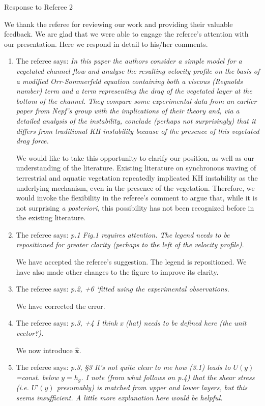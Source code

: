 \documentclass[letterpaper,10pt]{article}
\newcommand{\bx}{\mathbf{x}}
\begin{document}
\centerline{Response to Referee 2}
We thank the referee for reviewing our work and providing their valuable feedback. 
We are glad that we were able to engage the referee's attention with our presentation.
Here we respond in detail to his/her comments.
\begin{enumerate}
\item The referee says:
\textit{
In this paper the authors consider a simple model for a vegetated channel flow and analyse the resulting velocity profile on the basis of a modified Orr-Sommerfeld equation containing both a viscous (Reynolds number) term and a term representing the drag of the vegetated layer at the bottom of the channel. They compare some experimental data from an earlier paper from Nepf’s group with the implications of their theory and, via a detailed analysis of the instability, conclude (perhaps not surprisingly) that it differs from traditional KH instability because of the presence of this vegetated drag force.
}

We would like to take this opportunity to clarify our position, as well as our understanding of the literature.
Existing literature on synchronous waving of terrestrial and aquatic vegetation repeatedly implicated KH instability as the underlying mechanism, even in the presence of the vegetation. 
Therefore, we would invoke the flexibility in the referee's comment to argue that, while it is not surprising \textit{a posteriori}, this possibility has not been recognized before in the existing literature.

\item The referee says:
\textit{p.1 Fig.1 requires attention. The legend needs to be repositioned for greater
clarity (perhaps to the left of the velocity profile).}

We have accepted the referee's suggestion. The legend is repositioned. We have also made other changes to the figure to improve its clarity.

\item The referee says:
\textit{
p.2, +6 ‘fitted using the experimental observations.
}

We have corrected the error.

\item The referee says:
\textit{
p.3, +4 I think x (hat) needs to be defined here (the unit vector?).
}

We now introduce $\hat{\bx}$.

\item The referee says:
\textit{
p.3, \S 3 It’s not quite clear to me how (3.1) leads to $U(y)$=const. below $y=h_g$. I note (from what follows on p.4) that the shear stress (i.e. $U’(y)$ presumably) is
matched from upper and lower layers, but this seems insufficient. A little more explanation here would be helpful.
}


\end{enumerate}
\end{document}
